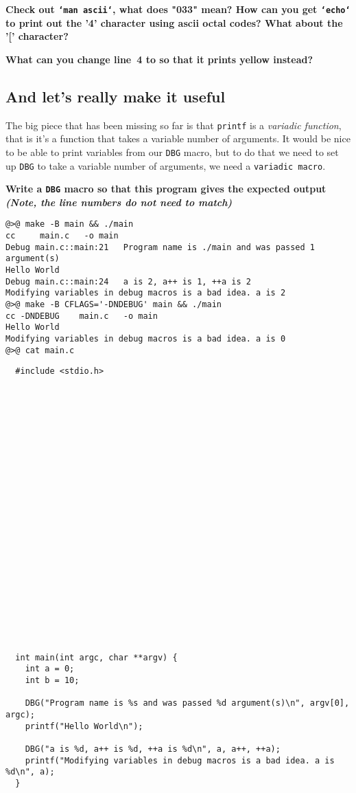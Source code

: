 \documentclass{article}
\begin{document}
\textbf{Check out \texttt{`man ascii`}, what does "033" mean? How can you get
\texttt{`echo`} to print out the '4' character using ascii octal codes? What about the '[' character?}
\vspace{2cm}

\textbf{What can you change line~4 to so that it prints yellow instead?}



\newpage
\subsection{And let's really make it useful}

The big piece that has been missing so far is that \texttt{printf} is a
\emph{variadic function}, that is it's a function that takes a variable
number of arguments. It would be nice to be able to print variables from our
\texttt{DBG} macro, but to do that we need to set up \texttt{DBG} to take a
variable number of arguments, we need a \texttt{variadic macro}.

\textbf{Write a \texttt{DBG} macro so that this program gives the expected output\\
  \emph{\small(Note, the line numbers do not need to match)}}

\begin{lstlisting}
@>@ make -B main && ./main
cc     main.c   -o main
Debug main.c::main:21	Program name is ./main and was passed 1 argument(s)
Hello World
Debug main.c::main:24	a is 2, a++ is 1, ++a is 2
Modifying variables in debug macros is a bad idea. a is 2
@>@ make -B CFLAGS='-DNDEBUG' main && ./main
cc -DNDEBUG    main.c   -o main
Hello World
Modifying variables in debug macros is a bad idea. a is 0
@>@ cat main.c
\end{lstlisting}

\begin{lstlisting}
  #include <stdio.h>
























  int main(int argc, char **argv) {
    int a = 0;
    int b = 10;

    DBG("Program name is %s and was passed %d argument(s)\n", argv[0], argc);
    printf("Hello World\n");

    DBG("a is %d, a++ is %d, ++a is %d\n", a, a++, ++a);
    printf("Modifying variables in debug macros is a bad idea. a is %d\n", a);
  }
\end{lstlisting}
\end{document}
